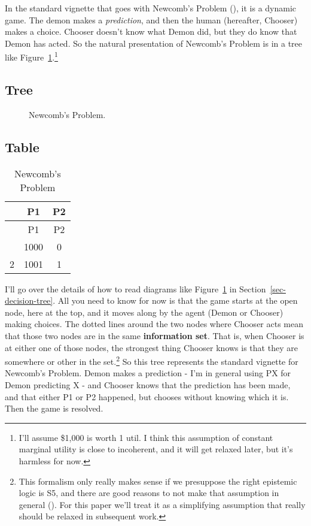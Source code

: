 \documentclass[
  10pt,
  letterpaper,
  DIV=11,
  numbers=noendperiod,
  twoside]{scrartcl}
\begin{document}
In the standard vignette that goes with Newcomb's Problem
(), it is a dynamic game. The
demon makes a \emph{prediction}, and then the human (hereafter, Chooser)
makes a choice. Chooser doesn't know what Demon did, but they do know
that Demon has acted. So the natural presentation of Newcomb's Problem
is in a tree like Figure~\ref{fig-standard-newcomb}.\footnote{I'll
  assume \$1,000 is worth 1 util. I think this assumption of constant
  marginal utility is close to incoherent, and it will get relaxed
  later, but it's harmless for now.}

\subsection{Tree}

\begin{figure}


\caption{\label{fig-standard-newcomb}Newcomb's Problem.}

\end{figure}%

\subsection{Table}

\begin{longtable}[]{@{}ccc@{}}
\caption{Newcomb's Problem}\label{tbl-standard-newcomb}\tabularnewline
\toprule\noalign{}
& P1 & P2 \\
\midrule\noalign{}
\endfirsthead
\toprule\noalign{}
& P1 & P2 \\
\midrule\noalign{}
\endhead
\bottomrule\noalign{}
\endlastfoot
1 & 1000 & 0 \\
2 & 1001 & 1 \\
\end{longtable}

I'll go over the details of how to read diagrams like
Figure~\ref{fig-standard-newcomb} in Section~\ref{sec-decision-tree}.
All you need to know for now is that the game starts at the open node,
here at the top, and it moves along by the agent (Demon or Chooser)
making choices. The dotted lines around the two nodes where Chooser acts
mean that those two nodes are in the same \textbf{information set}. That
is, when Chooser is at either one of those nodes, the strongest thing
Chooser knows is that they are somewhere or other in the set.\footnote{This
  formalism only really makes sense if we presuppose the right epistemic
  logic is S5, and there are good reasons to not make that assumption in
  general ().
  For this paper we'll treat it as a simplifying assumption that really
  should be relaxed in subsequent work.} So this tree represents the
standard vignette for Newcomb's Problem. Demon makes a prediction - I'm
in general using PX for Demon predicting X - and Chooser knows that the
prediction has been made, and that either P1 or P2 happened, but chooses
without knowing which it is. Then the game is resolved.
\end{document}

